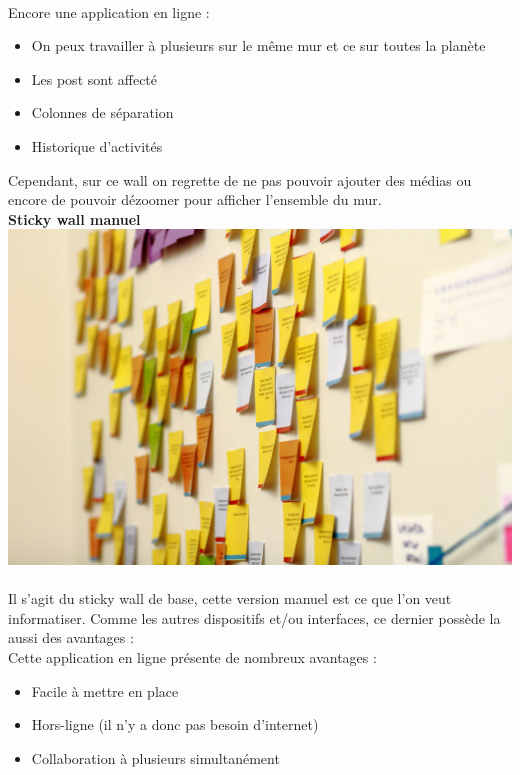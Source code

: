 \documentclass{article}
\begin{document}
\vspace{0.2cm}\\
Encore une application en ligne :
\begin{itemize}
  \item On peux travailler à plusieurs sur le même mur et ce sur toutes la planète
  \item Les post sont affecté
  \item Colonnes de séparation
  \item Historique d'activités
\end{itemize}
\vspace{0.2cm}
\hspace*{0.6cm}Cependant, sur ce wall on regrette de ne pas pouvoir ajouter des médias ou encore de pouvoir dézoomer pour afficher l'ensemble du mur.
\vspace{0.2cm}\\
\textbf{Sticky wall manuel}
\vspace{0.2cm}\\
\includegraphics[width=\textwidth]{1}\\
\vspace{0.2cm}\\
Il s'agit du sticky wall de base, cette version manuel est ce que l'on veut informatiser. Comme les autres dispositifs et/ou interfaces, ce dernier possède la aussi des avantages :
\vspace{0.2cm}\\
Cette application en ligne présente de nombreux avantages :
\begin{itemize}
  \item Facile à mettre en place
  \item Hors-ligne (il n'y a donc pas besoin d'internet)
  \item Collaboration à plusieurs simultanément
\end{itemize}
\end{document}

